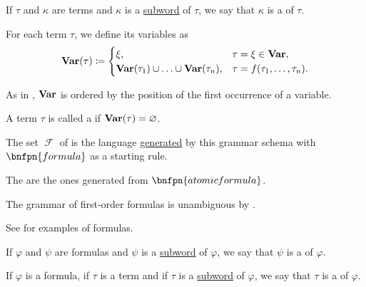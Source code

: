 \begin{definition}
\begin{thmenum}
     If \( \tau \) and \( \kappa \) are terms and \( \kappa \) is a \hyperref[def:language/subword]{subword} of \( \tau \), we say that \( \kappa \) is a  of \( \tau \).

     For each term \( \tau \), we define its variables as
    \begin{equation}\label{eq:def:first_order_syntax/term_variables}
      \operatorname{\mathbf{Var}}(\tau) \coloneqq \begin{cases}
        \xi,                                                    &\tau = \xi \in \operatorname{\mathbf{Var}},        \\
        \operatorname{\mathbf{Var}}(\tau_1) \cup \ldots \cup \operatorname{\mathbf{Var}}(\tau_n), &\tau = f(\tau_1, \ldots, \tau_n).
      \end{cases}
    \end{equation}

    As in , \( \operatorname{\mathbf{Var}} \) is ordered by the position of the first occurrence of a variable.

     A term \( \tau \) is called a  if \( \operatorname{\mathbf{Var}}(\tau) = \varnothing \).

     The set \( \mscrF \) of  is the language \hyperref[def:grammar_derivation/grammar_language]{generated} by this grammar schema with \( \bnfpn{formula} \) as a starting rule.

    The  are the ones generated from \( \bnfpn{atomic formula} \).

    The grammar of first-order formulas is unambiguous by .

    See  for examples of formulas.

     If \( \varphi \) and \( \psi \) are formulas and \( \psi \) is a \hyperref[def:language/subword]{subword} of \( \varphi \), we say that \( \psi \) is a  of \( \varphi \).

     If \( \varphi \) is a formula, if \( \tau \) is a term and if \( \tau \) is a \hyperref[def:language/subword]{subword} of \( \varphi \), we say that \( \tau \) is a  of \( \varphi \).


\end{thmenum}
\end{definition}
